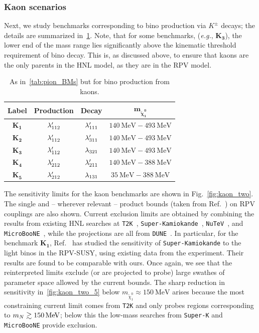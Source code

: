 \subsubsection{Kaon scenarios}
%
Next, we study benchmarks corresponding to bino production via $K^\pm$ decays; the 
details are summarized in~\cref{tab:kaon_BMs}. Note, that for some benchmarks, 
(\textit{e.g.}, $\bm{K_3}$), the lower end of the mass range lies significantly 
above the kinematic threshold requirement of bino decay. This is, as discussed 
above, to ensure that kaons are the only parents in the HNL model, as they are in 
the RPV model.

\begin{table}[h]
\centering
\begin{tabular}{|c|c|c|c|}
\hline
\bf{Label} & \bf{Production} & \bf{Decay} & $\bm{m_{\tilde{\chi}^0_1}}$\\
\hline
$\bm{K_1}$ & $\lambda'_{112}$ & $\lambda'_{111}$ & $\SI{140}{\MeV} - \SI{493}{\MeV}$\\
$\bm{K_2}$ & $\lambda'_{112}$ & $\lambda'_{311}$ & $\SI{140}{\MeV}-\SI{493}{\MeV}$\\
$\bm{K_3}$ & $\lambda'_{112}$ & $\lambda_{321}$ & $\SI{140}{\MeV} - \SI{493}{\MeV}$\\
$\bm{K_4}$ & $\lambda'_{212}$ & $\lambda'_{211}$ & $\SI{140}{\MeV}-\SI{388}{\MeV}$\\
$\bm{K_5}$ & $\lambda'_{212}$ & $\lambda_{131}$ & $\SI{35}{\MeV} - \SI{388}{\MeV}$\\
\hline
\end{tabular}
\caption{As in~\cref{tab:pion_BMs} but for bino production from kaons.}
\label{tab:kaon_BMs}
\end{table}

The sensitivity limits for the kaon benchmarks are shown in Fig.~\ref{fig:kaon_two}. The 
single and -- wherever relevant -- product bounds (taken from Ref.~\cite{Allanach:1999ic, 
Barbier:2004ez}) on RPV couplings are also shown. Current exclusion limits are obtained 
by combining the results from existing HNL searches at \texttt{T2K}~\cite{T2K:2019jwa}, 
\texttt{Super-Kamiokande}~\cite{Coloma:2019htx}, \texttt{NuTeV}~\cite{NuTeV:1999kej}, 
and \texttt{MicroBooNE}~\cite{Kelly:2021xbv, MicroBooNE:2022ctm}, while the projections 
are all from \texttt{DUNE}~\cite{Ballett:2019bgd}.
In particular, for the benchmark $\bm{K_1}$, Ref.~\cite{Candia:2021bsl} has studied the sensitivity of \texttt{Super-Kamiokande} to the light binos in the RPV-SUSY, using existing data from the experiment.
Their results are found to be comparable with ours.
Once again, we see that the reinterpreted limits exclude (or are projected to probe) large swathes of 
parameter space allowed by the current bounds. The sharp reduction in sensitivity 
in~\cref{fig:kaon_two_5} below $m_{\tilde{\chi}^0_1} \approx \SI{150}{\MeV}$ 
arises because the most constraining current limit comes from \texttt{T2K} and only probes regions corresponding to $m_N \gsim \SI{150}{\MeV}$; below this the low-mass searches from \texttt{Super-K} and \texttt{MicroBooNE} provide exclusion.

